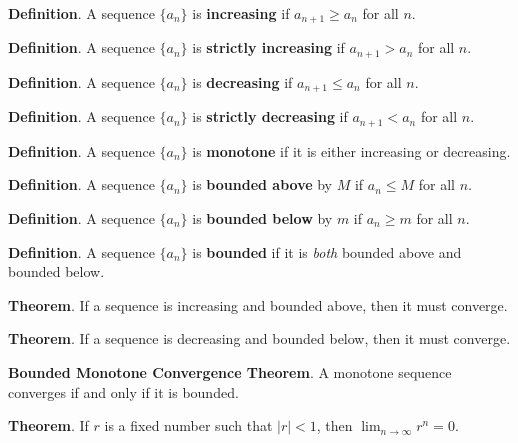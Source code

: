 \documentclass{exam}[12pt]
\begin{document}
\pagestyle{head}


\vspace{.6in}
\large{

\textbf{Definition}.  A sequence $\{a_n\}$ is \textbf{increasing} if $a_{n+1} \geq a_n$ for all $n$.
\vspace{.4in}

\textbf{Definition}.  A sequence $\{a_n\}$ is \textbf{strictly increasing} if $a_{n+1} > a_n$ for all $n$.
\vspace{.4in}

\textbf{Definition}.  A sequence $\{a_n\}$ is \textbf{decreasing} if $a_{n+1} \leq a_n$ for all $n$.
\vspace{.4in}

\textbf{Definition}.  A sequence $\{a_n\}$ is \textbf{strictly decreasing} if $a_{n+1} < a_n$ for all $n$.
\vspace{.4in}

\textbf{Definition}.  A sequence $\{a_n\}$ is \textbf{monotone} if it is either increasing or decreasing.
\vspace{.4in}

\textbf{Definition}.  A sequence $\{a_n\}$ is \textbf{bounded above} by $M$ if $a_n\leq M$ for all $n$.
\vspace{.4in}

\textbf{Definition}.  A sequence $\{a_n\}$ is \textbf{bounded below} by $m$ if $a_n\geq m$ for all $n$.
\vspace{.4in}

\textbf{Definition}.  A sequence $\{a_n\}$ is \textbf{bounded} if it is \emph{both} bounded above and bounded below.
\vspace{.6in}

\textbf{Theorem}.  If a sequence is increasing and bounded above, then it must converge.
\vspace{.4in}

\textbf{Theorem}.  If a sequence is decreasing and bounded below, then it must converge.
\vspace{.4in}

\textbf{Bounded Monotone Convergence Theorem}. A monotone sequence converges if and \hspace*{.5in} only if it is bounded.
\vspace{.4in}

\textbf{Theorem}. If $r$ is a fixed number such that $|r|<1$, then
$\displaystyle \lim_{n \to \infty} r^n =0$. \vspace{.4in}
}
\end{document}
